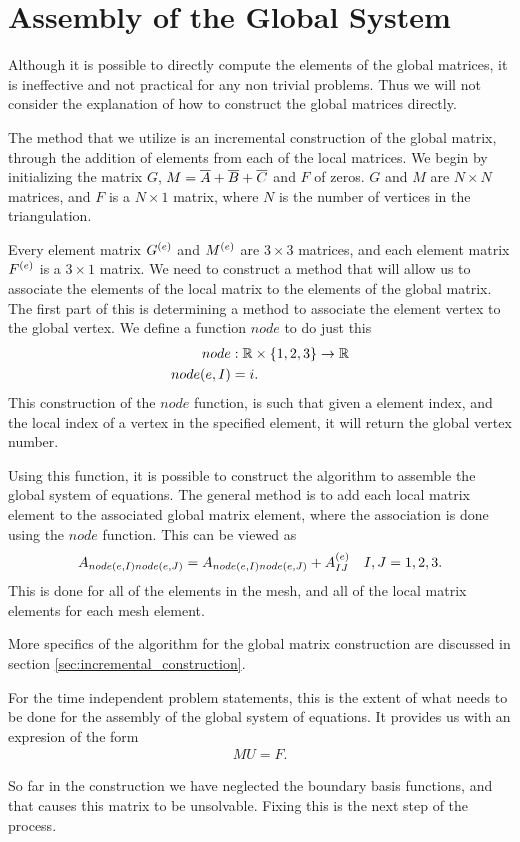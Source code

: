 \documentclass[../fem.tex]{subfile}
\begin{document}
\section{Assembly of the Global System}%
\label{sec:assembly_of_the_global_system}

Although it is possible to directly compute the elements of the global
matrices, it is ineffective and not practical for any non trivial problems.
Thus we will not consider the explanation of how to construct the global
matrices directly.

The method that we utilize is an incremental construction of the global matrix,
through the addition of elements from each of the local matrices. We begin by
initializing the matrix $G$, $M=\overline{A}+\overline{B}+\overline{C}$ and $F$ of zeros. $G$ and
$M$ are $N\times N$ matrices, and $F$ is a $N\times 1$ matrix, where $N$ is the
number of vertices in the triangulation.

Every element matrix $G^{(e)}$ and $M^{(e)}$ are $3\times 3$ matrices, and each element matrix
$F^{(e)}$ is a $3\times 1$ matrix. We need to construct a method that will allow
us to associate the elements of the local matrix to the elements of the global
matrix. The first part of this is determining a method to associate the element
vertex to the global vertex. We define a function $node$ to do just this
\begin{align*}
  node&:\mathbb{R}\times\{1,2,3\}\rightarrow\mathbb{R}\\
  node(e,I)&=i.
\end{align*}
This construction of the $node$ function, is such that given a element index,
and the local index of a vertex in the specified element, it will return the
global vertex number.

Using this function, it is possible to construct the algorithm to assemble the
global system of equations. The general method is to add each local matrix
element to the associated global matrix element, where the association is done
using the $node$ function. This can be viewed as
\begin{align*}
  A_{node(e,I)node(e,J)}=A_{node(e,I)node(e,J)}+A^{(e)}_{IJ}\quad I,J=1,2,3.
\end{align*}
This is done for all of the elements in the mesh, and all of the local matrix
elements for each mesh element.

More specifics of the algorithm for the global matrix construction are
discussed in section \ref{sec:incremental_construction}.

For the time independent problem statements, this is the extent of what needs
to be done for the assembly of the global system of equations. It provides us
with an expresion of the form
\begin{align*}
   MU=F.
\end{align*}

So far in the construction we have neglected the boundary basis functions, and
that causes this matrix to be unsolvable. Fixing this is the next step of the
process.
\end{document}
